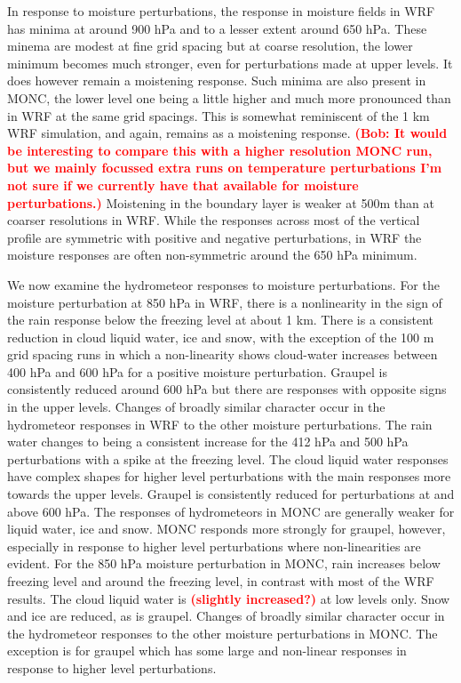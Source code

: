 \documentclass[draft]{agujournal2019}
\newcommand{\todo}[1]{\textcolor{red}{\textbf{(#1)}}}
\begin{document}
In response to moisture perturbations, the response in moisture fields in WRF
has minima at around 900 hPa and to a lesser extent around 650 hPa. These minema
are modest at fine grid spacing but at coarse resolution, the lower minimum
becomes much stronger, even for perturbations made at upper levels. It does
however remain a moistening response. Such minima are also present in MONC, the
lower level one being a little higher and much more pronounced than in WRF at
the same grid spacings. This is somewhat reminiscent of the 1 km WRF simulation,
and again, remains as a moistening response. \todo{Bob: It would be interesting
to compare this with a higher resolution MONC run, but we mainly focussed extra
runs on temperature perturbations I'm not sure if we currently have that
available for moisture perturbations.} Moistening in the boundary layer is
weaker at 500m than at coarser resolutions in WRF. While the responses across
most of the vertical profile are symmetric with positive and negative
perturbations, in WRF the moisture responses are often non-symmetric around the
650 hPa minimum.

We now examine the hydrometeor responses to moisture perturbations. For the
moisture perturbation at 850 hPa in WRF, there is a nonlinearity in the sign of
the rain response below the freezing level at about 1 km. There is a consistent
reduction in cloud liquid water, ice and snow, with the exception of the 100 m
grid spacing runs in which a non-linearity shows cloud-water increases between
400 hPa and 600 hPa for a positive moisture perturbation. Graupel is
consistently reduced around 600 hPa but there are responses with opposite signs
in the upper levels. Changes of broadly similar character occur in the
hydrometeor responses in WRF to the other moisture perturbations. The rain water
changes to being a consistent increase for the 412 hPa and 500 hPa perturbations
with a spike at the freezing level. The cloud liquid water responses have
complex shapes for higher level perturbations with the main responses more
towards the upper levels. Graupel is consistently reduced for perturbations at
and above 600 hPa. The responses of hydrometeors in MONC are generally weaker
for liquid water, ice and snow. MONC responds more strongly for graupel,
however, especially in response to higher level perturbations where
non-linearities are evident. For the 850 hPa moisture perturbation in MONC, rain
increases below freezing level and around the freezing level, in contrast with
most of the WRF results. The cloud liquid water is \todo{slightly increased?} at
low levels only. Snow and ice are reduced, as is graupel. Changes of broadly
similar character occur in the hydrometeor responses to the other moisture
perturbations in MONC. The exception is for graupel which has some large and
non-linear responses in response to higher level perturbations. 
\end{document}
